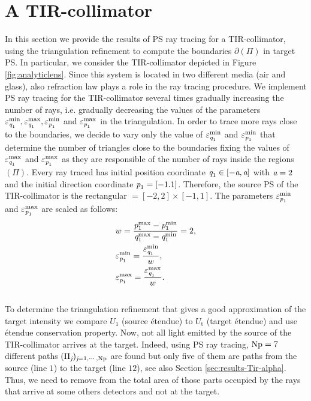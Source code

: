 \section{A TIR-collimator}
In this section we provide the results of PS ray tracing for a TIR-collimator, using the triangulation refinement to compute the boundaries $\partial$$(\Pi)$ in target PS. In particular, we consider the TIR-collimator depicted in Figure \ref{fig:analyticlens}. Since this system is located in two different media (air and glass), also refraction law plays a role in the ray tracing procedure. We implement PS ray tracing for the TIR-collimator several times gradually increasing the number of rays, i.e. gradually decreasing the values of the parameters $\varepsilon_{\textit{q}_1}^{\textrm{min}}, \varepsilon_{\textit{q}_1}^{\textrm{max}}, \varepsilon_{\textit{p}_1}^{\textrm{min}}$ and $\varepsilon_{\textit{p}_1}^{\textrm{max}}$ in the triangulation. In order to trace more rays close to the boundaries, we decide to vary only the value of $\varepsilon_{\textit{q}_1}^{\textrm{min}}$ and $ \varepsilon_{\textit{p}_1}^{\textrm{min}}$ that determine the number of triangles close to the boundaries fixing the values of $ \varepsilon_{\textit{q}_1}^{\textrm{max}}$ and $ \varepsilon_{\textit{p}_1}^{\textrm{max}}$ as they are responsible of the number of rays inside the regions $(\Pi)$. Every ray traced has initial position coordinate $\textit{q}_1\in[-\textit{a}, \textit{a}]$ with $\textit{a}=2$ and the initial direction coordinate $\textit{p}_1=[-1.1]$. Therefore, the source PS of the TIR-collimator is the rectangular $= [-2, 2] \times [-1, 1]$. The parameters $\varepsilon_{\textit{p}_1}^{\textrm{min}}$ and $\varepsilon_{\textit{p}_1}^{\textrm{max}}$ are scaled as follows:
\begin{equation}\label{eq:scaled_parameters}
\begin{aligned}
& w = \frac{\textit{p}_1^{\textrm{max}}-\textit{p}_1^{\textrm{min}}}{\textit{q}_1^{\textrm{max}}-\textit{q}_1^{\textrm{min}}}=2,\\
&\varepsilon_{\textit{p}_1}^{\textrm{min}}= \frac{\varepsilon_{\textit{q}_1}^{\textrm{min}}}{w}, \\
&\varepsilon_{\textit{p}_1}^{\textrm{max}}= \frac{\varepsilon_{\textit{q}_1}^{\textrm{max}}}{w}.
\end{aligned}
\end{equation}
\\ \indent To determine the triangulation refinement that gives a good approximation of the target intensity we compare $U_1$ (source \'{e}tendue) to $U_{\textrm{t}}$ (target \'{e}tendue) and use \'{e}tendue conservation property. Now, not all light emitted by the source of the TIR-collimator arrives at the target. Indeed, using PS ray tracing, $\textrm{Np}=7$ different paths $(\Pi_{\textit{j}})_{\textit{j}=1, \cdots, \textrm{Np}}$ are found but only five of them are paths from the source (line $1$) to the target (line $12$), see also Section \ref{sec:results-Tir-alpha}. Thus, we need to remove from the total area of  those parts occupied by the rays that arrive at some others detectors and not at the target. %
